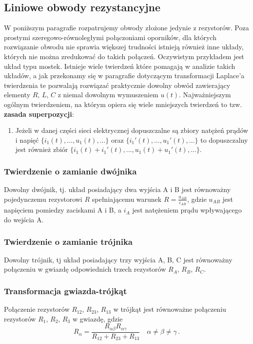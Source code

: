 \documentclass[../main.tex]{subfiles}
\begin{document}
\subsection{Liniowe obwody rezystancyjne}
W poniższym paragrafie rozpatrujemy obwody złożone jedynie z rezystorów. Poza prostymi
szeregowo-równoległymi połączoniami oporników, dla których rozwiązanie obwodu nie sprawia większej
trudności istnieją również inne układy, których nie można zredukować do takich połączeń. Oczywistym
przykładem jest układ typu mostek. Istnieje wiele twierdzeń które pomagają w analizie takich
układów, a jak przekonamy się w paragrafie dotyczącym transformacji Laplace'a twierdzenia te
pozwalają rozwiązać praktycznie dowolny obwód zawierający elementy \(R\), \(L\), \(C\) z niemal
dowolnym wymuszeniem \(u(t)\). Najważniejszym ogólnym twierdzeniem, na którym opiera się wiele
mniejszych twierdzeń to tzw. \textbf{zasada superpozycji}:
\begin{enumerate}[]
    \item Jeżeli w danej części sieci elektrycznej dopuszczalne są zbiory natężeń prądów i napięć
    \(\{i_1(t),...,u_1(t),...\}\) oraz \(\{ i_1'(t),...,u_1'(t),... \}\) to dopuszczalny jest
    również zbiór \(\{i_1(t)+i_1'(t),...,u_1(t)+u_1'(t),...\}\).
\end{enumerate}
\subsubsection*{Twierdzenie o zamianie dwójnika}
Dowolny dwójnik, tj. układ posiadający dwa wyjścia A i B jest równoważny pojedynczemu rezystorowi
\(R\) spełniającemu warunek \(R=\frac{u_{AB}}{i_{AB}}\), gdzie \(u_{AB}\) jest napięciem pomiedzy
zaciskami A i B, a \(i_{A}\) jest natężeniem prądu wpływającego do wejścia A.

\subsubsection*{Twierdzenie o zamianie trójnika}
Dowolny trójnik, tj układ posiadający trzy wyjścia A, B, C jest równoważny połączeniu w gwiazdę
odpowiednich trzech rezystorów \(R_A\), \(R_B\), \(R_C\).

\subsubsection*{Transformacja gwiazda-trójkąt}
Połączenie rezystorów \(R_{12}\), \(R_{23}\), \(R_{13}\) w trójkąt jest równoważne połączeniu
rezystorów \(R_1\), \(R_2\), \(R_3\) w gwiazdę, gdzie
\begin{equation*}
    R_\alpha=\frac{R_{\alpha\beta}R_{\alpha\gamma}}{R_{12}+R_{23}+R_{13}}\quad \alpha\neq\beta\neq\gamma\,.
\end{equation*}
\end{document}
